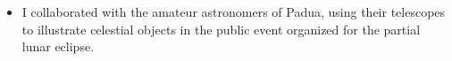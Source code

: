 \begin{experiences}
{\begin{itemize}
     \end{itemize}}
    \emptySeparator
     {}{
     \begin{itemize}
         \item I collaborated with the amateur astronomers of Padua, using their telescopes to illustrate celestial objects in the public event organized for the partial lunar eclipse.
     \end{itemize}}
\end{experiences}